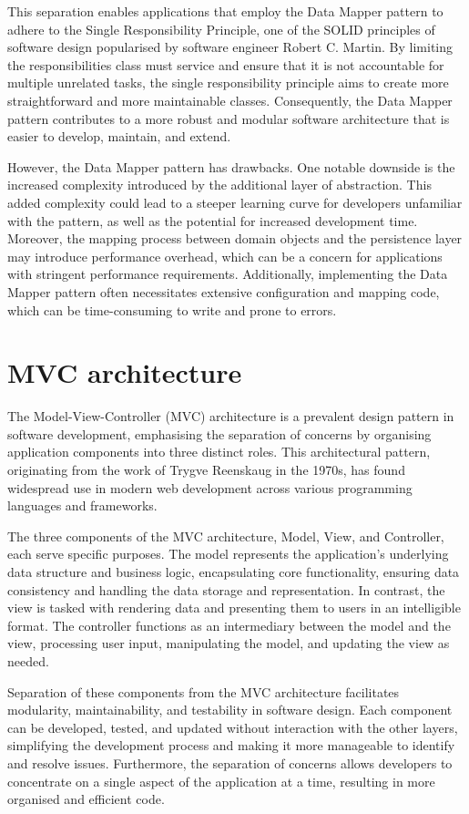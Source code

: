This separation enables applications that employ the Data Mapper pattern to
adhere to the Single Responsibility Principle, one of the SOLID principles of
software design popularised by software engineer Robert C. Martin. By limiting
the responsibilities class must service and ensure that it is not accountable
for multiple unrelated tasks, the single responsibility principle aims to create
more straightforward and more maintainable classes. Consequently, the Data
Mapper pattern contributes to a more robust and modular software architecture
that is easier to develop, maintain, and extend.

However, the Data Mapper pattern has drawbacks. One notable downside is the
increased complexity introduced by the additional layer of abstraction. This
added complexity could lead to a steeper learning curve for developers
unfamiliar with the pattern, as well as the potential for increased development
time. Moreover, the mapping process between domain objects and the persistence
layer may introduce performance overhead, which can be a concern for
applications with stringent performance requirements. Additionally, implementing
the Data Mapper pattern often necessitates extensive configuration and mapping
code, which can be time-consuming to write and prone to errors.


\section{MVC architecture}
The Model-View-Controller (MVC) architecture is a prevalent design pattern in
software development, emphasising the separation of concerns by organising
application components into three distinct roles. This architectural pattern,
originating from the work of Trygve Reenskaug in the 1970s, has found widespread
use in modern web development across various programming languages and
frameworks.

The three components of the MVC architecture, Model, View, and Controller, each
serve specific purposes. The model represents the application's underlying data
structure and business logic, encapsulating core functionality, ensuring data
consistency and handling the data storage and representation. In contrast, the
view is tasked with rendering data and presenting them to users in an
intelligible format. The controller functions as an intermediary between the
model and the view, processing user input, manipulating the model, and updating
the view as needed.

Separation of these components from the MVC architecture facilitates modularity,
maintainability, and testability in software design. Each component can be
developed, tested, and updated without interaction with the other layers,
simplifying the development process and making it more manageable to identify
and resolve issues. Furthermore, the separation of concerns allows developers to
concentrate on a single aspect of the application at a time, resulting in more
organised and efficient code.

